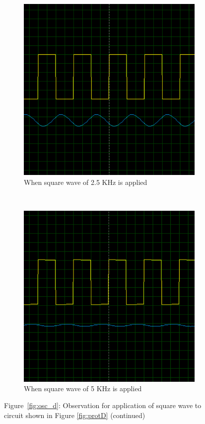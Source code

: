 \documentclass{lab_sheet}
\begin{document}
\begin{figure}[H]
   \ContinuedFloat
   \centering
   \begin{subfigure}{0.49\textwidth}
      \centering
   \includegraphics[width=0.9\linewidth]{../Figures/osc_d_4.png}
   \caption{When square wave of 2.5 KHz is applied}
   \end{subfigure}~
   \begin{subfigure}{0.49\textwidth}
      \centering
   \includegraphics[width=0.9\linewidth]{../Figures/osc_d_3.png}
   \caption{When square wave of 5 KHz is applied}
   \end{subfigure}
      \caption*{Figure~\ref{fig:osc_d}: Observation for application of square wave to circuit shown in Figure \ref{fig:protD} (continued)}
\end{figure}
\end{document}
